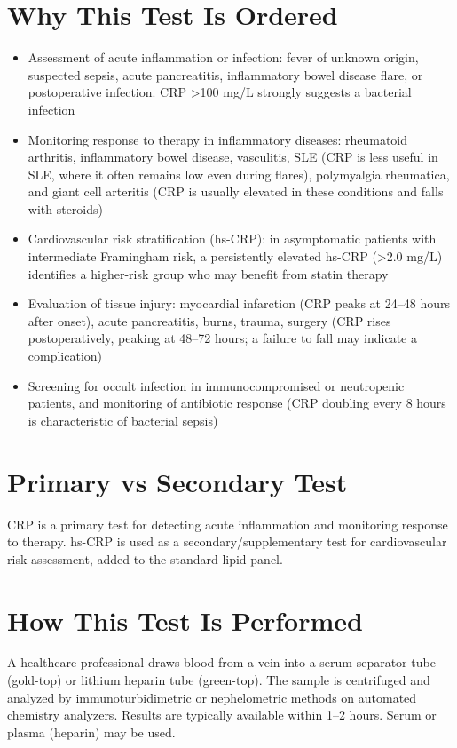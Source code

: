 \section*{Why This Test Is Ordered}
\begin{itemize}
  \item Assessment of acute inflammation or infection: fever of unknown origin, suspected sepsis, acute pancreatitis, inflammatory bowel disease flare, or postoperative infection. CRP >100 mg/L strongly suggests a bacterial infection
  \item Monitoring response to therapy in inflammatory diseases: rheumatoid arthritis, inflammatory bowel disease, vasculitis, SLE (CRP is less useful in SLE, where it often remains low even during flares), polymyalgia rheumatica, and giant cell arteritis (CRP is usually elevated in these conditions and falls with steroids)
  \item Cardiovascular risk stratification (hs-CRP): in asymptomatic patients with intermediate Framingham risk, a persistently elevated hs-CRP (>2.0 mg/L) identifies a higher-risk group who may benefit from statin therapy
  \item Evaluation of tissue injury: myocardial infarction (CRP peaks at 24--48 hours after onset), acute pancreatitis, burns, trauma, surgery (CRP rises postoperatively, peaking at 48--72 hours; a failure to fall may indicate a complication)
  \item Screening for occult infection in immunocompromised or neutropenic patients, and monitoring of antibiotic response (CRP doubling every 8 hours is characteristic of bacterial sepsis)
\end{itemize}

\section*{Primary vs Secondary Test}
CRP is a primary test for detecting acute inflammation and monitoring response to therapy. hs-CRP is used as a secondary/supplementary test for cardiovascular risk assessment, added to the standard lipid panel.

\section*{How This Test Is Performed}
A healthcare professional draws blood from a vein into a serum separator tube (gold-top) or lithium heparin tube (green-top). The sample is centrifuged and analyzed by immunoturbidimetric or nephelometric methods on automated chemistry analyzers. Results are typically available within 1--2 hours. Serum or plasma (heparin) may be used.

